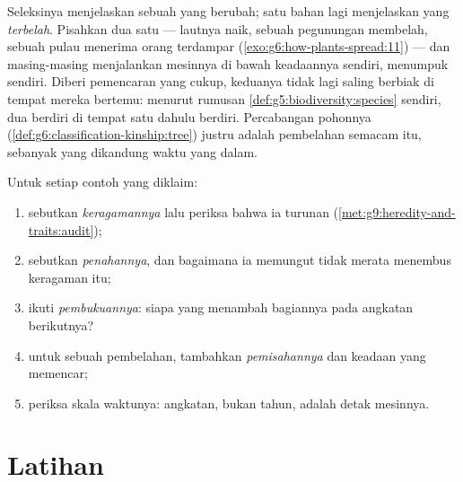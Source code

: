 \begin{proposition}\label{prop:g9:how-species-change:speciation}
Seleksinya menjelaskan sebuah  yang berubah; satu
bahan lagi menjelaskan  yang \emph{terbelah}.
Pisahkan dua  satu  --- lautnya naik, sebuah
pegunungan membelah, sebuah pulau menerima orang terdampar
(\cref{exo:g6:how-plants-spread:11}) --- dan masing-masing
menjalankan mesinnya di bawah keadaannya sendiri, menumpuk
 sendiri. Diberi pemencaran yang cukup, keduanya
tidak lagi saling berbiak di tempat mereka bertemu: menurut
rumusan \cref{def:g5:biodiversity:species} sendiri, dua
 berdiri di tempat satu  dahulu berdiri.
Percabangan pohonnya (\cref{def:g6:classification-kinship:tree})
justru adalah pembelahan semacam itu, sebanyak yang
dikandung waktu yang dalam.
\end{proposition}
\admitted

\begin{method}\label{met:g9:how-species-change:run}
Untuk setiap contoh  yang diklaim:
\begin{enumerate}
  \item sebutkan \emph{keragamannya} lalu periksa bahwa ia
        turunan (\cref{met:g9:heredity-and-traits:audit});
  \item sebutkan \emph{penahannya}, dan bagaimana ia
        memungut tidak merata menembus keragaman itu;
  \item ikuti \emph{pembukuannya}:  siapa yang menambah
        bagiannya pada angkatan berikutnya?
  \item untuk sebuah pembelahan, tambahkan
        \emph{pemisahannya} dan keadaan yang memencar;
  \item periksa skala waktunya: angkatan, bukan tahun,
        adalah detak mesinnya.
\end{enumerate}
\end{method}

\section{Latihan}

